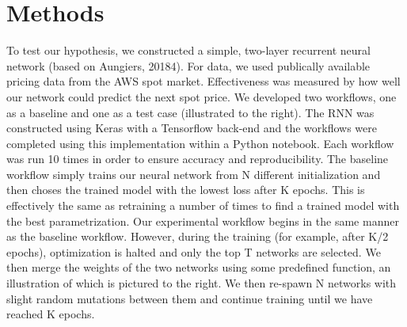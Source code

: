\section{Methods}
\label{sec:methods}
To test our hypothesis, we constructed a simple, two-layer recurrent neural network (based on Aungiers, 20184). For data, we used publically available pricing data from the AWS spot market. Effectiveness was measured by how well our network could predict the next spot price. 
We developed two workflows, one as a baseline and one as a test case (illustrated to the right). The RNN was constructed using Keras with a Tensorflow back-end and the workflows were completed using this implementation within a Python notebook. Each workflow was run 10 times in order to ensure accuracy and reproducibility.
The baseline workflow simply trains our neural network from N different initialization and then choses the trained model with the lowest loss after K epochs. This is effectively the same as retraining a number of times to find a trained model with the best parametrization.
Our experimental workflow begins in the same manner as the baseline workflow. However, during the training (for example, after K/2 epochs), optimization is halted and only the top T networks are selected. We then merge the weights of the two networks using some predefined function, an illustration of which is pictured to the right. We then re-spawn N networks with slight random mutations between them and continue training until we have reached K epochs.

